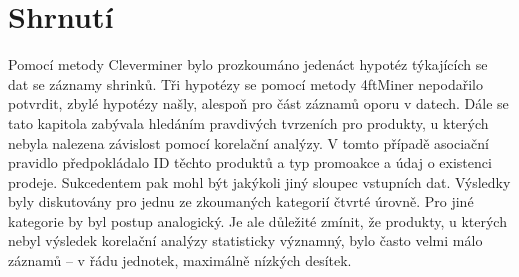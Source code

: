 \section*{Shrnutí}

Pomocí metody Cleverminer bylo prozkoumáno jedenáct hypotéz týkajících se dat se záznamy shrinků. Tři hypotézy se pomocí metody 4ftMiner nepodařilo potvrdit, zbylé hypotézy našly, alespoň pro část záznamů oporu v datech.
Dále se tato kapitola zabývala hledáním pravdivých tvrzeních pro produkty, u kterých nebyla nalezena závislost pomocí korelační analýzy. V tomto případě asociační pravidlo předpokládalo ID těchto produktů a typ promoakce a údaj o existenci prodeje. Sukcedentem pak mohl být jakýkoli jiný sloupec vstupních dat. Výsledky byly diskutovány pro jednu ze zkoumaných kategorií čtvrté úrovně. Pro jiné kategorie by byl postup analogický.
Je ale důležité zmínit, že produkty, u kterých nebyl výsledek korelační analýzy statisticky významný, bylo často velmi málo záznamů -- v řádu jednotek, maximálně nízkých desítek.


